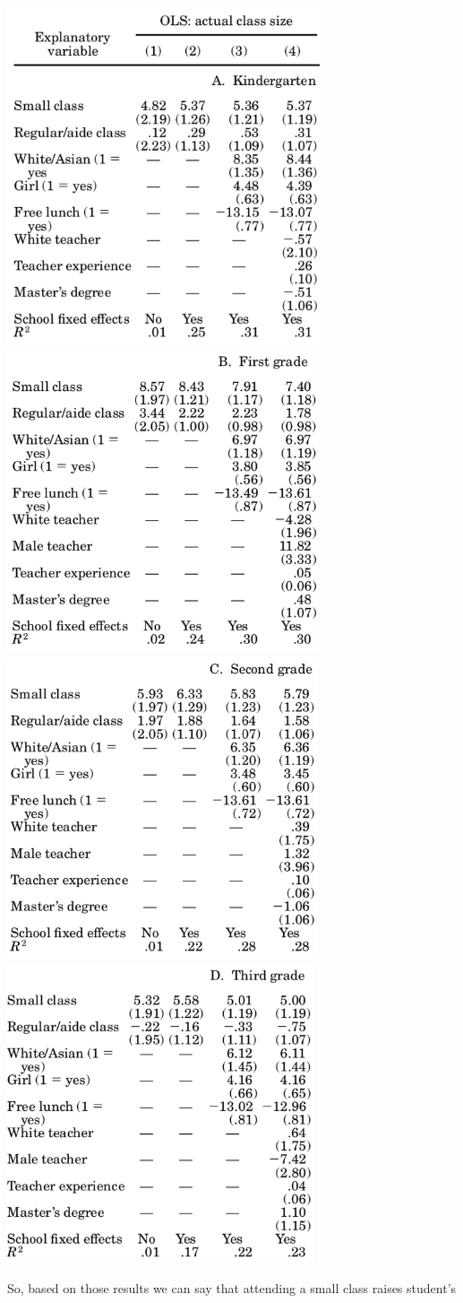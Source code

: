 \documentclass[]{book}
\begin{document}
\includegraphics[width=3.64in]{images/krueger2} \includegraphics[width=3.62in]{images/krueger3} \includegraphics[width=3.6in]{images/krueger4} \includegraphics[width=3.56in]{images/krueger5}

So, based on those results we can say that attending a small class raises student's 
\end{document}
